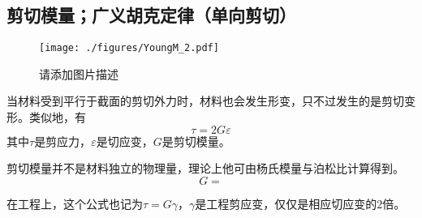 \subsection{剪切模量；广义胡克定律（单向剪切）}
\begin{figure}[ht]
\centering
\texttt{[image: ./figures/YoungM\_2.pdf]}
\caption{请添加图片描述} \label{YoungM_fig2}
\end{figure}
当材料受到平行于截面的剪切外力时，材料也会发生形变，只不过发生的是剪切变形。类似地，有
\begin{equation}
\tau=2G\varepsilon
\end{equation}
其中$\tau$是剪应力，$\varepsilon$是切应变，$G$是剪切模量。

剪切模量并不是材料独立的物理量，理论上他可由杨氏模量与泊松比计算得到。
\begin{equation}
G = 
\end{equation}

在工程上，这个公式也记为$\tau=G\gamma$，$\gamma$是工程剪应变，仅仅是相应切应变的$2$倍。